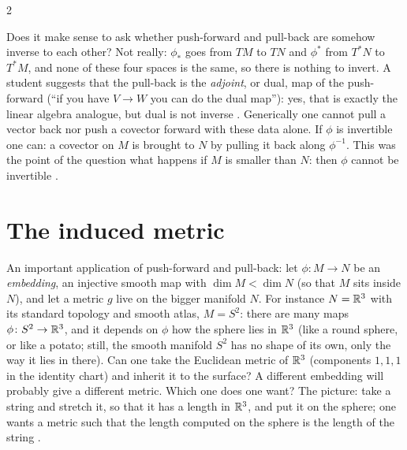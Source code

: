 \begin{paracol}{2}
\begin{coursenote}
Does it make sense to ask whether push-forward and pull-back are somehow inverse to each other? Not really: $\phi_*$ goes from $TM$ to $TN$ and $\phi^*$ from $T^*N$ to $T^*M$, and none of these four spaces is the same, so there is nothing to invert. A student suggests that the pull-back is the \emph{adjoint}, or dual, map of the push-forward (``if you have $V\to W$ you can do the dual map''): yes, that is exactly the linear algebra analogue, but dual is not inverse .
Generically one cannot pull a vector back nor push a covector forward with these data alone. If $\phi$ is invertible one can: a covector on $M$ is brought to $N$ by pulling it back along $\phi^{-1}$. This was the point of the question what happens if $M$ is smaller than $N$: then $\phi$ cannot be invertible .
\end{coursenote}

\section{The induced metric}\label{sec:c11-induced}

An important application of push-forward and pull-back: let $\phi\colon M\to N$ be an \emph{embedding}, an injective smooth map with $\dim M<\dim N$ (so that $M$ sits inside $N$), and let a metric $g$ live on the bigger manifold $N$. For instance $N=\mathbb{R}^3$ with its standard topology and smooth atlas, $M=S^2$: there are many maps $\phi\colon S^2\to\mathbb{R}^3$, and it depends on $\phi$ how the sphere lies in $\mathbb{R}^3$ (like a round sphere, or like a potato; still, the smooth manifold $S^2$ has no shape of its own, only the way it lies in there). Can one take the Euclidean metric of $\mathbb{R}^3$ (components $1,1,1$ in the identity chart) and inherit it to the surface? A different embedding will probably give a different metric. Which one does one want? The picture: take a string and stretch it, so that it has a length in $\mathbb{R}^3$, and put it on the sphere; one wants a metric such that the length computed on the sphere is the length of the string .


\end{paracol}
